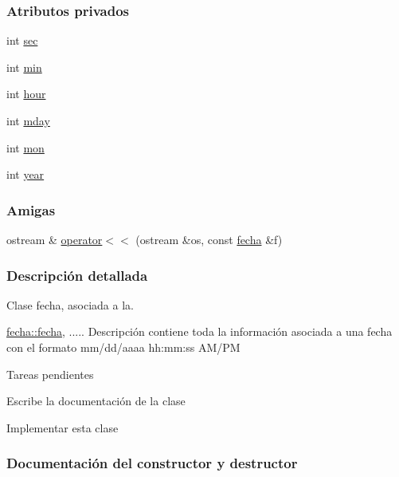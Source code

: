 \subsubsection*{Atributos privados}
\begin{DoxyCompactItemize}
\item 
int \hyperlink{classfecha_a09eb9f4865c9ff896f438b8df3cf6485}{sec}
\item 
int \hyperlink{classfecha_a3875f28ff6e7c383923c80e86afaec2e}{min}
\item 
int \hyperlink{classfecha_a895a2cc9dd11326a8392a4c6fc928a14}{hour}
\item 
int \hyperlink{classfecha_a9c1dc50e5f5efcd3e30a981bfd495b1d}{mday}
\item 
int \hyperlink{classfecha_a5c86be74f1215600f99798d54126ba16}{mon}
\item 
int \hyperlink{classfecha_a4d06534f05a6350ae229ce2b17b860e8}{year}
\end{DoxyCompactItemize}
\subsubsection*{Amigas}
\begin{DoxyCompactItemize}
\item 
ostream \& \hyperlink{classfecha_a9787de38b43ae62ba2c0812f3dd18394}{operator$<$$<$} (ostream \&os, const \hyperlink{classfecha}{fecha} \&f)
\end{DoxyCompactItemize}


\subsubsection{Descripción detallada}
Clase fecha, asociada a la. 

\hyperlink{classfecha_a6775ef84b5838e12e28fd341793f4539}{fecha\+::fecha}, ..... Descripción contiene toda la información asociada a una fecha con el formato mm/dd/aaaa hh\+:mm\+:ss A\+M/\+P\+M \begin{DoxyRefDesc}{Tareas pendientes}
\item[\hyperlink{todo__todo000001}{Tareas pendientes}]Escribe la documentación de la clase 

Implementar esta clase\end{DoxyRefDesc}


\subsubsection{Documentación del constructor y destructor}
\hypertarget{classfecha_a6775ef84b5838e12e28fd341793f4539}{}
